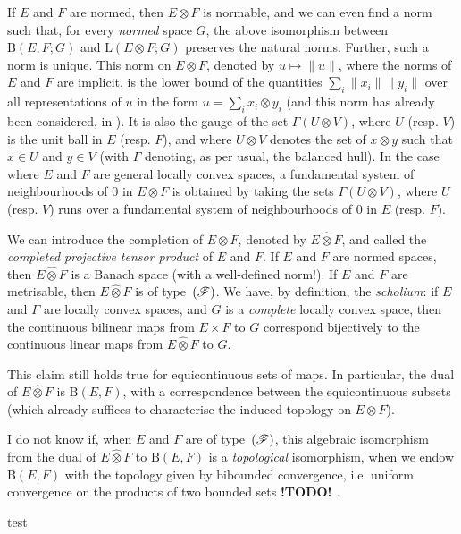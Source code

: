 \documentclass{article}
\theoremstyle{plain}
\newcommand{\BB}{\mathrm{B}}
\newcommand{\LL}{\mathrm{L}}
\newcommand{\FF}{\mbox{\normalfont($\mathscr{F}$)}}
\newcommand{\hotimes}{\widehat{\otimes}}
\newcommand{\todo}{\textbf{ !TODO! }}
\newcommand{\oldpage}[1]{\marginpar{\footnotesize$\Big\vert$ \textit{p.~#1}}}
\begin{document}
If $E$ and $F$ are normed, then $E\otimes F$ is normable, and we can even find a norm such that, for every \emph{normed} space $G$, the above isomorphism between $\BB(E,F;G)$ and $\LL(E\otimes F;G)$ preserves the natural norms.
Further, such a norm is unique.
This norm on $E\otimes F$, denoted by $u\mapsto\|u\|$, where the norms of $E$ and $F$ are implicit, is the lower bound of the quantities $\sum_i\|x_i\|\|y_i\|$ over all representations of $u$ in the form $u=\sum_i x_i\otimes y_i$ (and this norm has already been considered, in \cite{8}).
It is also the gauge of the set $\Gamma(U\otimes V)$, where $U$ (resp. $V$) is the unit ball in $E$ (resp. $F$), and where $U\otimes V$ denotes the set of $x\otimes y$ such that $x\in U$ and $y\in V$
\oldpage{77}
(with $\Gamma$ denoting, as per usual, the balanced hull).
In the case where $E$ and $F$ are general locally convex spaces, a fundamental system of neighbourhoods of $0$ in $E\otimes F$ is obtained by taking the sets $\Gamma(U\otimes V)$, where $U$ (resp. $V$) runs over a fundamental system of neighbourhoods of $0$ in $E$ (resp. $F$).

We can introduce the completion of $E\otimes F$, denoted by $E\hotimes F$, and called the \emph{completed projective tensor product} of $E$ and $F$.
If $E$ and $F$ are normed spaces, then $E\hotimes F$ is a Banach space (with a well-defined norm!).
If $E$ and $F$ are metrisable, then $E\hotimes F$ is of type~$\FF$.
We have, by definition, the \emph{scholium}: if $E$ and $F$ are locally convex spaces, and $G$ is a \emph{complete} locally convex space, then the continuous bilinear maps from $E\times F$ to $G$ correspond bijectively to the continuous linear maps from $E\hotimes F$ to $G$.

This claim still holds true for equicontinuous sets of maps.
In particular, the dual of $E\hotimes F$ is $\BB(E,F)$, with a correspondence between the equicontinuous subsets (which already suffices to characterise the induced topology on $E\otimes F$).

I do not know if, when $E$ and $F$ are of type~$\FF$, this algebraic isomorphism from the dual of $E\hotimes F$ to $\BB(E,F)$ is a \emph{topological} isomorphism, when we endow $\BB(E,F)$ with the topology given by bibounded convergence, i.e. uniform convergence on the products of two bounded sets \todo.

test



\nocite{*}
\end{document}
